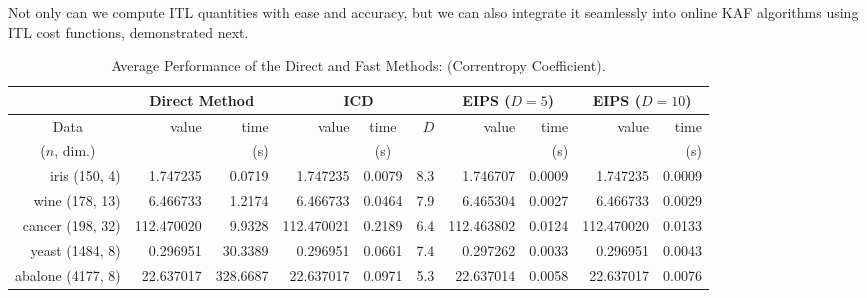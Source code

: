 \documentclass[8pt,twocolumn]{IEEEtran}
\newcommand{\cmmnt}[1]{}
\begin{document}
Not only can we compute ITL quantities with ease and accuracy, but we can also integrate it seamlessly into online KAF algorithms using ITL cost functions, demonstrated next.

\begin{table}[ht]\renewcommand{\arraystretch}{1.5}
	\tiny
	\centering\caption{Average Performance of the Direct and Fast Methods: (Correntropy Coefficient).}
	\label{tab:CC}
	\setlength\tabcolsep{1pt}
	\begin{tabular}{ |r|r r|r c r|r r|r r|}
		\cline{2-10}		
		\multicolumn{1}{c|}{}& \multicolumn{2}{c|}{\scriptsize Direct Method} & \multicolumn{3}{c|}{\scriptsize ICD} & \multicolumn{2}{c|}{{\scriptsize EIPS} ($D = 5$)}& \multicolumn{2}{c|}{{\scriptsize EIPS} ($D = 10$)}\\\hline
		\multicolumn{1}{|c|}{\scriptsize Data} &\scriptsize value  & \scriptsize time &\scriptsize  value  &\scriptsize time & $D$ & \scriptsize value  &\scriptsize time &\scriptsize  value  &\scriptsize time\\
		\multicolumn{1}{|c|}{($n$, dim.)}&\scriptsize & \scriptsize (s) &\scriptsize  &\scriptsize (s) &  & \scriptsize &\scriptsize (s) &\scriptsize  &\scriptsize (s)\\ \hline\hline
		{\scriptsize	iris} (150, 4) &1.747235 &   0.0719 &1.747235  &  0.0079 & \cmmnt{D} 8.3 & 1.746707 &   0.0009& 1.747235 &   0.0009 \\ \hline
		{\scriptsize	wine} (178, 13)&6.466733  &  1.2174 &6.466733 &   0.0464 & \cmmnt{D} 7.9 &6.465304   & 0.0027 &6.466733  &  0.0029\\ \hline
		{\scriptsize	cancer} (198, 32) &112.470020  &  9.9328& 112.470021  &  0.2189 & \cmmnt{D} 6.4 & 112.463802  &  0.0124 & 112.470020  &  0.0133\\ \hline
		{\scriptsize	yeast} (1484, 8) &0.296951 & 30.3389 &0.296951  &  0.0661& \cmmnt{D} 7.4 &0.297262   & 0.0033 &0.296951  &  0.0043\\ \hline
		{\scriptsize	abalone} (4177, 8)  &22.637017 & 328.6687 &22.637017 &   0.0971 & \cmmnt{D} 5.3 &  22.637014  &  0.0058 &   22.637017  &  0.0076\\ \hline
	\end{tabular}
	\normalsize
\end{table}
\end{document}
